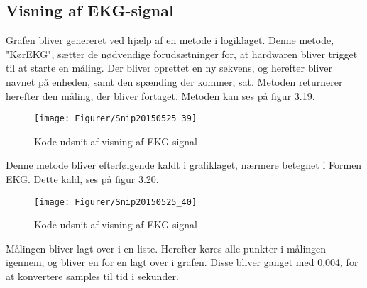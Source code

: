\subsection{Visning af EKG-signal}
Grafen bliver genereret ved hjælp af en metode i logiklaget. Denne metode, "KørEKG", sætter de nødvendige forudsætninger for, at hardwaren bliver trigget til at starte en måling. Der bliver oprettet en ny sekvens, og herefter bliver navnet på enheden, samt den spænding der kommer, sat. Metoden returnerer herefter den måling, der bliver fortaget. Metoden kan ses på figur 3.19.

\begin{figure}[H]
	\centering
	\texttt{[image: Figurer/Snip20150525\_39]}
	\caption{Kode udsnit af visning af EKG-signal}
\end{figure}

Denne metode bliver efterfølgende kaldt i grafiklaget, nærmere betegnet i Formen EKG. Dette kald, ses på figur 3.20.

\begin{figure}[H]
	\centering
	\texttt{[image: Figurer/Snip20150525\_40]}
	\caption{Kode udsnit af visning af EKG-signal}
\end{figure}

Målingen bliver lagt over i en liste. Herefter køres alle punkter i målingen igennem, og bliver en for en lagt over i grafen. Disse bliver ganget med 0,004, for at konvertere samples til tid i sekunder. 



